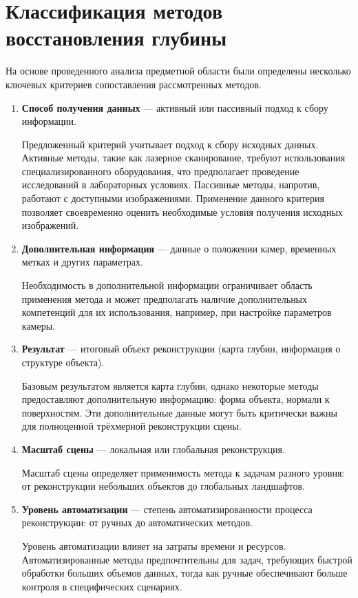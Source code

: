 \section{Классификация методов восстановления глубины}

На основе проведенного анализа предметной области были определены несколько ключевых критериев сопоставления рассмотренных методов.

\begin{enumerate}[label=\arabic*.]
    \item \textbf{Способ получения данных} --- активный или пассивный подход к сбору информации.

    Предложенный критерий учитывает подход к сбору исходных данных.
    Активные методы, такие как лазерное сканирование, требуют использования специализированного оборудования, что
    предполагает проведение исследований в лабораторных условиях.
    Пассивные методы, напротив, работают с доступными изображениями.
    Применение данного критерия позволяет своевременно
    оценить необходимые условия получения исходных изображений.

    \item \textbf{Дополнительная информация} --- данные о положении камер, временных метках и других параметрах.

    Необходимость в дополнительной информации ограничивает область применения метода и
    может предполагать наличие дополнительных компетенций для их использования, например, при настройке параметров камеры.

    \item \textbf{Результат} --- итоговый объект реконструкции (карта глубин, информация о структуре объекта).

    Базовым результатом является карта глубин, однако некоторые методы предоставляют дополнительную информацию:
    форма объекта, нормали к поверхностям.
    Эти дополнительные данные могут быть критически важны для полноценной трёхмерной реконструкции сцены.

    \item \textbf{Масштаб сцены} --- локальная или глобальная реконструкция.

    Масштаб сцены определяет применимость метода к задачам разного уровня: от реконструкции небольших объектов до глобальных ландшафтов.

    \item \textbf{Уровень автоматизации} --- степень автоматизированности процесса реконструкции: от ручных до автоматических методов.

    Уровень автоматизации влияет на затраты времени и ресурсов.
    Автоматизированные методы предпочтительны для задач, требующих быстрой обработки больших объемов данных,
    тогда как ручные обеспечивают больше контроля в специфических сценариях.
\end{enumerate}

